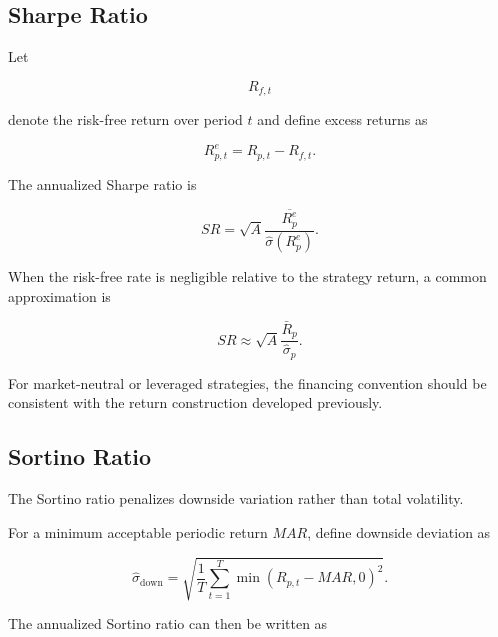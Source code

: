 \documentclass[11pt,a4paper]{article}
\begin{document}
\subsection{Sharpe Ratio}

Let

\begin{equation}
R_{f,t}
\end{equation}

denote the risk-free return over period $t$ and define excess returns as

\begin{equation}
R_{p,t}^{e}
=
R_{p,t}-R_{f,t}.
\end{equation}

The annualized Sharpe ratio is

\begin{equation}
\boxed{
SR
=
\sqrt{A}
\frac{
\overline{R_p^{e}}
}{
\widehat{\sigma}(R_p^{e})
}.
}
\end{equation}

When the risk-free rate is negligible relative to the strategy return, a common
approximation is

\begin{equation}
SR
\approx
\sqrt{A}
\frac{
\bar{R}_p
}{
\widehat{\sigma}_p
}.
\end{equation}

For market-neutral or leveraged strategies, the financing convention should be
consistent with the return construction developed previously.


\subsection{Sortino Ratio}

The Sortino ratio penalizes downside variation rather than total volatility.

For a minimum acceptable periodic return $MAR$, define downside deviation as

\begin{equation}
\widehat{\sigma}_{\mathrm{down}}
=
\sqrt{
\frac{1}{T}
\sum_{t=1}^{T}
\min
\left(
R_{p,t}-MAR,
0
\right)^2
}.
\end{equation}

The annualized Sortino ratio can then be written as
\end{document}
